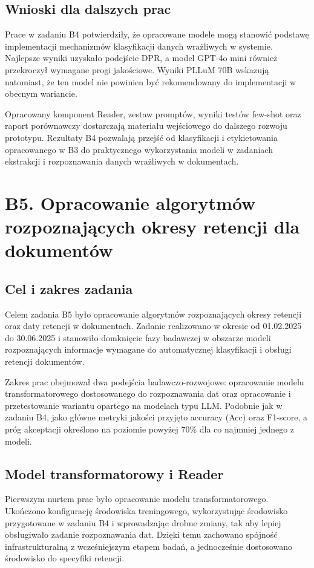 \documentclass[12pt,a4paper]{report}
\begin{document}
\subsection{Wnioski dla dalszych prac}
Prace w zadaniu B4 potwierdziły, że opracowane modele mogą stanowić podstawę implementacji mechanizmów klasyfikacji danych wrażliwych w systemie. Najlepsze wyniki uzyskało podejście DPR, a model GPT-4o mini również przekroczył wymagane progi jakościowe. Wyniki PLLuM 70B wskazują natomiast, że ten model nie powinien być rekomendowany do implementacji w obecnym wariancie.

Opracowany komponent Reader, zestaw promptów, wyniki testów few-shot oraz raport porównawczy dostarczają materiału wejściowego do dalszego rozwoju prototypu. Rezultaty B4 pozwalają przejść od klasyfikacji i etykietowania opracowanego w B3 do praktycznego wykorzystania modeli w zadaniach ekstrakcji i rozpoznawania danych wrażliwych w dokumentach.



\section{B5. Opracowanie algorytmów rozpoznających okresy retencji dla dokumentów}
\subsection{Cel i zakres zadania}
Celem zadania B5 było opracowanie algorytmów rozpoznających okresy retencji oraz daty retencji w dokumentach. Zadanie realizowano w okresie od 01.02.2025 do 30.06.2025 i stanowiło domknięcie fazy badawczej w obszarze modeli rozpoznających informacje wymagane do automatycznej klasyfikacji i obsługi retencji dokumentów.

Zakres prac obejmował dwa podejścia badawczo-rozwojowe: opracowanie modelu transformatorowego dostosowanego do rozpoznawania dat oraz opracowanie i przetestowanie wariantu opartego na modelach typu LLM. Podobnie jak w zadaniu B4, jako główne metryki jakości przyjęto accuracy (Acc) oraz F1-score, a próg akceptacji określono na poziomie powyżej 70\% dla co najmniej jednego z modeli.

\subsection{Model transformatorowy i Reader}
Pierwszym nurtem prac było opracowanie modelu transformatorowego. Ukończono konfigurację środowiska treningowego, wykorzystując środowisko przygotowane w zadaniu B4 i wprowadzając drobne zmiany, tak aby lepiej obsługiwało zadanie rozpoznawania dat. Dzięki temu zachowano spójność infrastrukturalną z wcześniejszym etapem badań, a jednocześnie dostosowano środowisko do specyfiki retencji.
\end{document}
